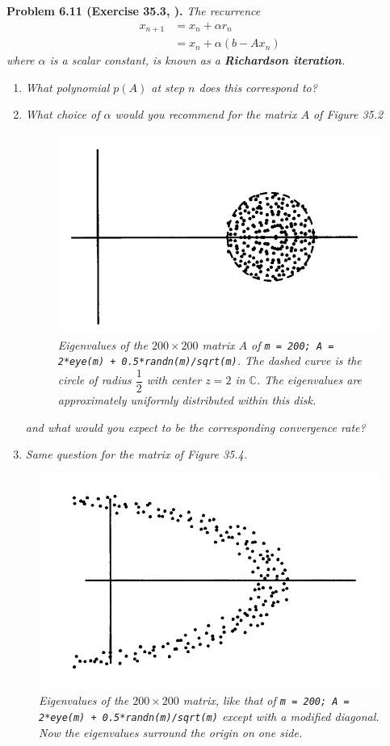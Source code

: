 \documentclass[a4paper,oneside]{book}
\numberwithin{equation}{chapter}
\begin{document}
\textbf{Problem 6.11 (Exercise 35.3, \cite{1}).} \textit{The recurrence}
\begin{align}
{x_{n + 1}} &= {x_n} + \alpha {r_n}\\
& = {x_n} + \alpha \left( {b - A{x_n}} \right)
\end{align}
\textit{where $\alpha$ is a scalar constant, is known as a \textbf{Richardson iteration}.}
\begin{enumerate}
\item \textit{What polynomial $p\left(A\right)$ at step $n$ does this correspond to?}
\item \textit{What choice of $\alpha$ would you recommend for the matrix $A$ of Figure 35.2}
\begin{figure}[H]
	\centering
	\includegraphics[scale=0.35]{11}
	\caption{\textit{Eigenvalues of the $200\times 200$ matrix $A$ of \texttt{m = 200; A = 2*eye(m) + 0.5*randn(m)/sqrt(m)}. The dashed curve is the circle of radius $\dfrac{1}{2}$ with center $z=2$ in $\mathbb{C}$. The eigenvalues are approximately uniformly distributed within this disk.}}
\end{figure}
\textit{and what would you expect to be the corresponding convergence rate?}
\item \textit{Same question for the matrix of Figure 35.4.}
\end{enumerate}
\begin{figure}[H]
	\centering
	\includegraphics[scale=0.35]{12}
	\caption{\textit{Eigenvalues of the $200\times 200$ matrix, like that of \texttt{m = 200; A = 2*eye(m) + 0.5*randn(m)/sqrt(m)} except with a modified diagonal. Now the eigenvalues surround the origin on one side.}}
\end{figure}
\end{document}
